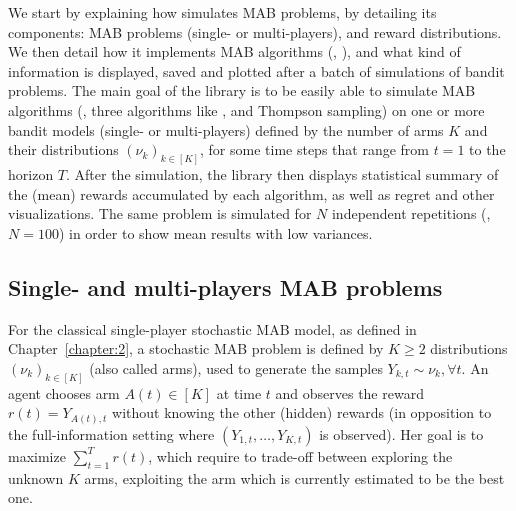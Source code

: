 We start by explaining how \SMPyBandits{} simulates MAB problems, by detailing its components:
MAB problems (single- or multi-players),
and reward distributions.
%
We then detail how it implements MAB algorithms (\eg, \UCB),
and what kind of information is displayed, saved and plotted after a batch of simulations of bandit problems.
%
%
The main goal of the library is to be easily able to simulate MAB algorithms (\eg, three algorithms like \UCB, \klUCB{} and Thompson sampling) on one or more bandit models (single- or multi-players) defined by the number of arms $K$ and their distributions $(\nu_k)_{k\in[K]}$, for some time steps that range from $t=1$ to the horizon $T$.
After the simulation, the library then displays statistical summary of the (mean) rewards accumulated by each algorithm, as well as regret and other visualizations.
The same problem is simulated for $N$ independent repetitions (\eg, $N=100$) in order to show mean results with low variances.


\subsection{Single- and multi-players MAB problems}

For the classical single-player stochastic MAB model, as defined in Chapter~\ref{chapter:2},
a stochastic MAB problem is defined by $K \geq 2$ distributions $(\nu_k)_{k\in[K]}$ (also called arms),
used to generate the \iid{} samples $Y_{k,t} \sim \nu_k, \forall t$.
%
An agent chooses arm $A(t)\in[K]$ at time $t$ and observes the reward $r(t) = Y_{A(t),t}$ without knowing the other (hidden) rewards (in opposition to the full-information setting where $(Y_{1,t},\dots,Y_{K,t})$ is observed).
%
Her goal is to maximize $\sum_{t=1}^T r(t)$, which require to trade-off between exploring the unknown $K$ arms, exploiting the arm which is currently estimated to be the best one.

